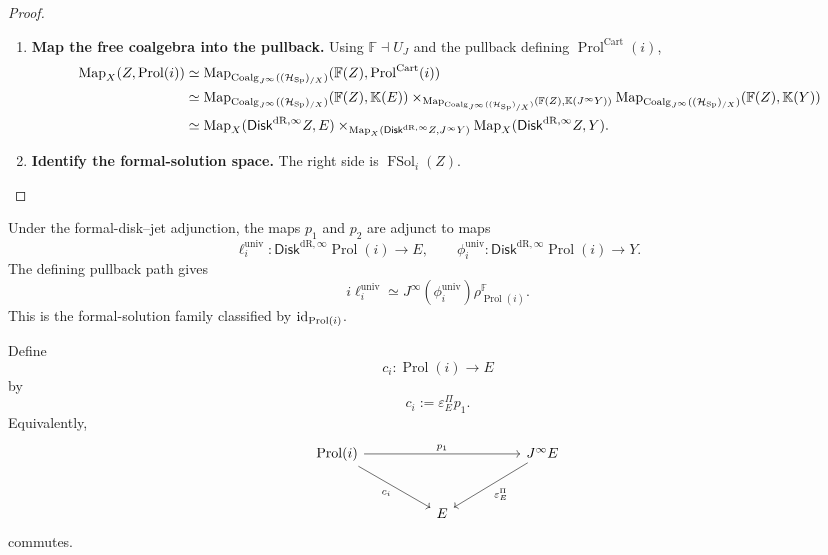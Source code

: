 \begin{proof}
\leavevmode
\begin{enumerate}[label=\textup{(\arabic*)}]
    \item \textbf{Map the free coalgebra into the pullback.}
Using \(\mathbb F\dashv U_J\) and the pullback defining \(\operatorname{Prol}^{\mathrm{Cart}}(i)\),
\[
\begin{aligned}
  \operatorname{Map}_X(Z,\operatorname{Prol}(i))
  &\simeq
  \operatorname{Map}_{\operatorname{Coalg}_{J^\infty}((\mathcal H_{\operatorname{Sp}})_{/X})}(\mathbb F(Z),\operatorname{Prol}^{\mathrm{Cart}}(i))\\
  &\simeq
  \operatorname{Map}_{\operatorname{Coalg}_{J^\infty}((\mathcal H_{\operatorname{Sp}})_{/X})}(\mathbb F(Z),\mathbb K(E))
  \times_{\operatorname{Map}_{\operatorname{Coalg}_{J^\infty}((\mathcal H_{\operatorname{Sp}})_{/X})}(\mathbb F(Z),\mathbb K(J^\infty Y))}
  \operatorname{Map}_{\operatorname{Coalg}_{J^\infty}((\mathcal H_{\operatorname{Sp}})_{/X})}(\mathbb F(Z),\mathbb K(Y))\\
  &\simeq
  \operatorname{Map}_X(\mathsf{Disk}^{\mathrm{dR},\infty} Z,E)
  \times_{\operatorname{Map}_X(\mathsf{Disk}^{\mathrm{dR},\infty} Z,J^\infty Y)}
  \operatorname{Map}_X(\mathsf{Disk}^{\mathrm{dR},\infty} Z,Y).
\end{aligned}
\]

    \item \textbf{Identify the formal-solution space.}
The right side is \(\operatorname{FSol}_i(Z)\).
\end{enumerate}
\end{proof}

Under the formal-disk--jet adjunction, the maps \(p_1\) and \(p_2\) are adjunct to
maps
\[
  \ell_i^{\mathrm{univ}}:\mathsf{Disk}^{\mathrm{dR},\infty} \operatorname{Prol}(i)\to E,
  \qquad
  \phi_i^{\mathrm{univ}}:\mathsf{Disk}^{\mathrm{dR},\infty} \operatorname{Prol}(i)\to Y.
\]
The defining pullback path gives
\[
  i\ell_i^{\mathrm{univ}}
  \simeq
  J^\infty(\phi_i^{\mathrm{univ}})\rho_{\operatorname{Prol}(i)}^{\mathbb F}.
\]
This is the formal-solution family classified by \(\operatorname{id}_{\operatorname{Prol}(i)}\).

\begin{definition}
Define
\[
  c_i:\operatorname{Prol}(i)\to E
\]
by
\[
  c_i:=\varepsilon^\Pi_Ep_1.
\]
Equivalently,
\[
\begin{tikzcd}[column sep=huge,row sep=large]
\operatorname{Prol}(i)
  \ar[rr,"p_1"]
  \ar[dr,"c_i"']
&&
J^\infty E \ar[dl,"\varepsilon^\Pi_E"]\\
& E &
\end{tikzcd}
\]
commutes.
\end{definition}

